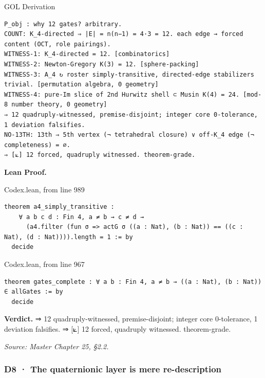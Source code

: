 \documentclass[10pt,twocolumn]{article}
\begin{document}
\begin{golbox}{GOL Derivation}
\begin{lstlisting}[style=golv]
P_obj : why 12 gates? arbitrary.
COUNT: K_4-directed ⇒ |E| = n(n−1) = 4·3 = 12. each edge → forced content (OCT, role pairings).
WITNESS-1: K_4-directed = 12. [combinatorics]
WITNESS-2: Newton-Gregory K(3) = 12. [sphere-packing]
WITNESS-3: A_4 ↻ roster simply-transitive, directed-edge stabilizers trivial. [permutation algebra, 0 geometry]
WITNESS-4: pure-Im slice of 2nd Hurwitz shell ⊂ Musin K(4) = 24. [mod-8 number theory, 0 geometry]
⇒ 12 quadruply-witnessed, premise-disjoint; integer core 0-tolerance, 1 deviation falsifies.
NO-13TH: 13th ⇒ 5th vertex (¬ tetrahedral closure) ∨ off-K_4 edge (¬ completeness) = ∅.
⇒ [⟀] 12 forced, quadruply witnessed. theorem-grade.
\end{lstlisting}
\end{golbox}

\textbf{Lean Proof.}

\begin{leanexcerpt}{Codex.lean, from line 989}
\begin{lstlisting}[style=leanx,firstnumber=989]
theorem a4_simply_transitive :
    ∀ a b c d : Fin 4, a ≠ b → c ≠ d →
      (a4.filter (fun σ => actG σ ((a : Nat), (b : Nat)) == ((c : Nat), (d : Nat)))).length = 1 := by
  decide
\end{lstlisting}
\end{leanexcerpt}

\begin{leanexcerpt}{Codex.lean, from line 967}
\begin{lstlisting}[style=leanx,firstnumber=967]
theorem gates_complete : ∀ a b : Fin 4, a ≠ b → ((a : Nat), (b : Nat)) ∈ allGates := by
  decide
\end{lstlisting}
\end{leanexcerpt}

\textbf{Verdict.} ⇒ 12 quadruply-witnessed, premise-disjoint; integer
core 0-tolerance, 1 deviation falsifies. ⇒ {[}⟀{]} 12 forced, quadruply
witnessed. theorem-grade.

\emph{Source: Master Chapter 25, §2.2.}

\hypertarget{d8-the-quaternionic-layer-is-mere-re-description}{%
\subsubsection{D8 · The quaternionic layer is mere
re-description}\label{d8-the-quaternionic-layer-is-mere-re-description}}
\end{document}
